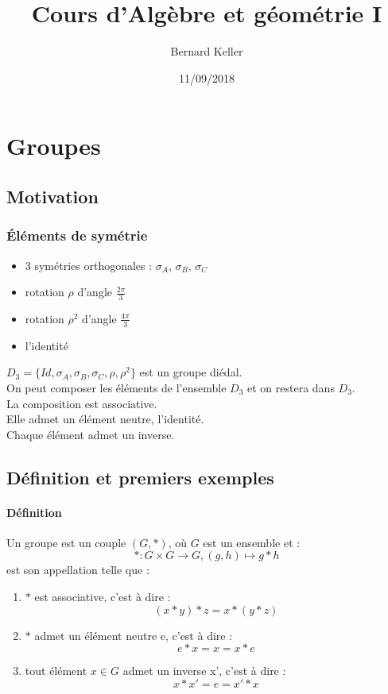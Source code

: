 \documentclass[a4paper, oneside]{report}
\newcommand{\x}{\times}
\begin{document}
\title{Cours d'Algèbre et géométrie I}
\date{11/09/2018}
\author{Bernard Keller}
\maketitle

\tableofcontents{}
\chapter{Groupes}

\section{Motivation}

\subsection{Éléments de symétrie}
\begin{itemize}
\item 3 symétries orthogonales : $\sigma_A$, $\sigma_B$, $\sigma_C$
\item rotation $\rho$ d'angle $\frac{2\pi}{3}$
\item rotation $\rho^2$ d'angle $\frac{4\pi}{3}$
\item l'identité
\end{itemize}

$D_3=\{Id, \sigma_A, \sigma_B, \sigma_C, \rho, \rho^2\}$ est un groupe diédal.\\
On peut composer les éléments de l'ensemble $D_3$ et on restera dans $D_3$.\\
La composition est associative.\\
Elle admet un élément neutre, l'identité.\\
Chaque élément admet un inverse.

\section{Définition et premiers exemples}

\subsubsection{Définition}
Un groupe est un couple $(G,*)$, où $G$ est un ensemble et :
$$*:G\x G \rightarrow G, (g,h)\mapsto g*h$$
est son appellation telle que :
\begin{enumerate}
\item $*$ est associative, c'est à dire :
$$(x*y)*z=x*(y*z)$$
\item $*$ admet un élément neutre e, c'est à dire :
$$e*x = x = x*e$$
\item tout élément $x\in G$ admet un inverse x', c'est à dire :
$$x*x'=e=x'*x$$
\end{enumerate}
\end{document}
